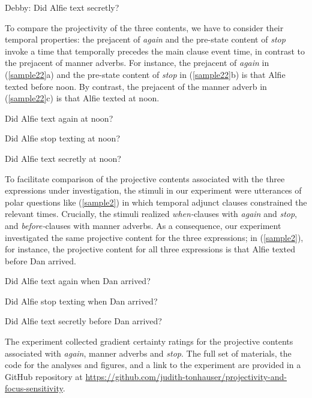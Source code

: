 \documentclass[a4paper,12pt]{article}
\newcommand{\6}{\mbox{$[\hspace*{-.6mm}[$}}
\newcommand{\9}{\mbox{$]\hspace*{-.6mm}]$}}
\begin{document}
\begin{exe}
\ex\label{sample} Debby: Did Alfie text secretly?
\end{exe}

To compare the projectivity of the three contents, we have to consider their temporal properties: the prejacent of {\em again} and the pre-state content of {\em stop} invoke a time that temporally precedes the main clause event time, in contrast to the prejacent of manner adverbs. For instance, the prejacent of {\em again} in (\ref{sample22}a) and the pre-state content of {\em stop} in (\ref{sample22}b) is that Alfie texted before noon. By contrast, the prejacent of the manner adverb in (\ref{sample22}c) is that Alfie texted at noon.

\begin{exe}

\ex\label{sample22}

\begin{xlist}

\ex Did Alfie text again at noon?

\ex Did Alfie stop texting at noon?

\ex Did Alfie text secretly at noon?

\end{xlist}

\end{exe}
To facilitate comparison of the projective contents associated with the three expressions under investigation, the stimuli in our experiment were utterances of polar questions like (\ref{sample2}) in which temporal adjunct clauses constrained the relevant times. Crucially, the stimuli realized {\em when-}clauses with {\em again} and {\em stop}, and {\em before-}clauses with manner adverbs. As a consequence, our experiment investigated the same projective content for the three expressions; in (\ref{sample2}), for instance, the projective content for all three expressions is that Alfie texted before Dan arrived.

\begin{exe}

\ex\label{sample2}

\begin{xlist}

\ex Did Alfie text again when Dan arrived? 

\ex Did Alfie stop texting when Dan arrived? 

\ex Did Alfie text secretly before Dan arrived? 

\end{xlist}

\end{exe}
The experiment collected gradient certainty ratings for the projective contents associated with {\em again}, manner adverbs and {\em stop}. The full set of materials, the code for the analyses and figures, and a link to the experiment are provided in a GitHub repository at \url{https://github.com/judith-tonhauser/projectivity-and-focus-sensitivity}.
\end{document}
